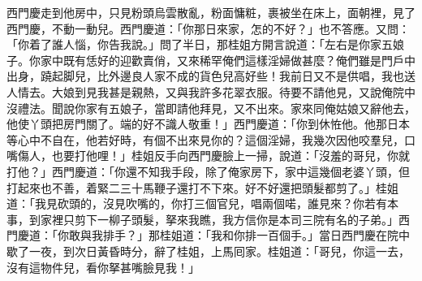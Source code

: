 西門慶走到他房中，只見粉頭烏雲散亂，粉面慵粧，裹被坐在床上，面朝裡，見了西門慶，不動一動兒。{}西門慶道：「你那日來家，怎的不好？」也不答應。{}又問：「你着了誰人惱，你告我說。」問了半日，那桂姐方開言說道：「左右是你家五娘子。你家中既有恁好的迎歡賣俏，{}又來稀罕俺們這樣淫婦做甚麼？俺們雖是門戶中出身，蹺起脚兒，比外邊良人家不成的貨色兒高好些！{}我前日又不是供唱，我也送人情去。大娘到見我甚是親熱，又與我許多花翠衣服。待要不請他見，又說俺院中沒禮法。聞說你家有五娘子，當即請他拜見，又不出來。家來同俺姑娘又辭他去，他使丫頭把房門關了。端的好不識人敬重！」西門慶道：「你到休恠他。他那日本等心中不自在，他若好時，有個不出來見你的？這個淫婦，我幾次因他咬羣兒，口嘴傷人，也要打他哩！」桂姐反手向西門慶臉上一掃，說道：「沒羞的哥兒，你就打他？」{}西門慶道：「你還不知我手段，除了俺家房下，家中這幾個老婆丫頭，但打起來也不善，着緊二三十馬鞭子還打不下來。好不好還把頭髮都剪了。」桂姐道：「我見砍頭的，沒見吹嘴的，你打三個官兒，唱兩個喏，誰見來？你若有本事，到家裡只剪下一柳子頭髮，拏來我瞧，我方信你是本司三院有名的子弟。」{}西門慶道：「你敢與我排手？」{}那桂姐道：「我和你排一百個手。」當日西門慶在院中歇了一夜，到次日黃昏時分，辭了桂姐，上馬囘家。桂姐道：「哥兒，你這一去，沒有這物件兒，看你拏甚嘴臉見我！」

